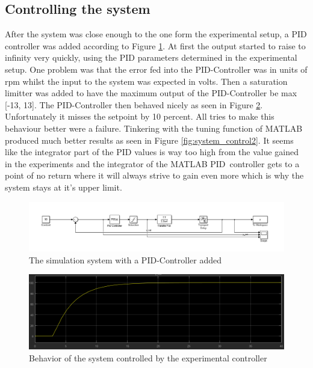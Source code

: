 \subsection{Controlling the system}

After the system was close enough to the one form the experimental setup, a PID controller was added according to Figure \ref{fig:PID_system}. At first the output started to raise to infinity very quickly, using the PID parameters determined in the experimental setup. One problem was that the error fed into the PID-Controller was in units of rpm whilst the input to the system was expected in volts. Then a saturation limitter was added to have the maximum output of the PID-Controller be max [-13, 13]. The PID-Controller then behaved nicely as seen in Figure \ref{fig:system_control1}. Unfortunately it misses the setpoint by 10 percent. All tries to make this behaviour better were a failure. Tinkering with the tuning function of MATLAB produced much better results as seen in Figure \ref{fig:system_control2}. It seems like the integrator part of the PID values is way too high from the value gained in the experiments and the integrator of the MATLAB PID controller gets to a point of no return where it will always strive to gain even more which is why the system stays at it's upper limit.

\begin{figure}[H]
\begin{center}
\includegraphics[width=1\linewidth]{images/general/PID_system}
\end{center}
\caption{The simulation system with a PID-Controller added}
\label{fig:PID_system}
\end{figure}

\begin{figure}[H]
\begin{center}
\includegraphics[width=1\linewidth]{images/general/system_control1}
\end{center}
\caption{Behavior of the system controlled by the experimental controller}
\label{fig:system_control1}
\end{figure}


